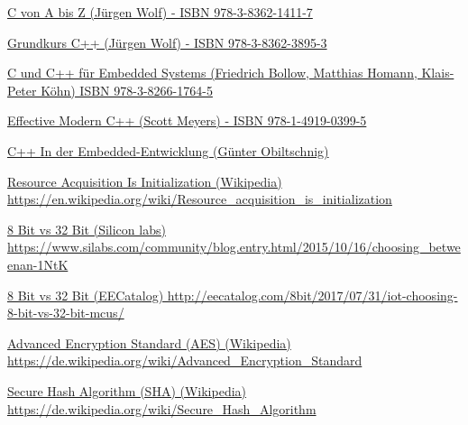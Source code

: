 \documentclass[MES,Master,ngerman]{twbook}%
\begin{document}
%
%
\clearpage
\begin{thebibliography}{9}
	
\href{C von A bis Z}{C von A bis Z (Jürgen Wolf) - ISBN 978-3-8362-1411-7}

\href{Grundkurs C++}{Grundkurs C++ (Jürgen Wolf) - ISBN 978-3-8362-3895-3}

\href{C und C++ für Embedded Systems}{C und C++ für Embedded Systems (Friedrich Bollow, Matthias Homann, Klais-Peter Köhn)  ISBN 978-3-8266-1764-5}

\href{Effective Modern C++ }{Effective Modern C++  (Scott Meyers) - ISBN 978-1-4919-0399-5}

\href{dd}{C++ In der Embedded-Entwicklung (Günter Obiltschnig)}

\href{dd}{Resource Acquisition Is Initialization (Wikipedia) \newline https://en.wikipedia.org/wiki/Resource\_acquisition\_is\_initialization}

\href{dd}{8 Bit vs 32 Bit (Silicon labs) \newline https://www.silabs.com/community/blog.entry.html/2015/10/16/choosing\_betweenan-1NtK}

\href{dd}{8 Bit vs 32 Bit (EECatalog) \newline http://eecatalog.com/8bit/2017/07/31/iot-choosing-8-bit-vs-32-bit-mcus/}


\href{dd}{Advanced Encryption Standard (AES) (Wikipedia) \newline https://de.wikipedia.org/wiki/Advanced\_Encryption\_Standard}

\href{dd}{Secure Hash Algorithm (SHA) (Wikipedia) \newline https://de.wikipedia.org/wiki/Secure\_Hash\_Algorithm}

	

		
\end{thebibliography}
\clearpage

\listoffigures
\clearpage

\listoftables
\clearpage
\end{document}

